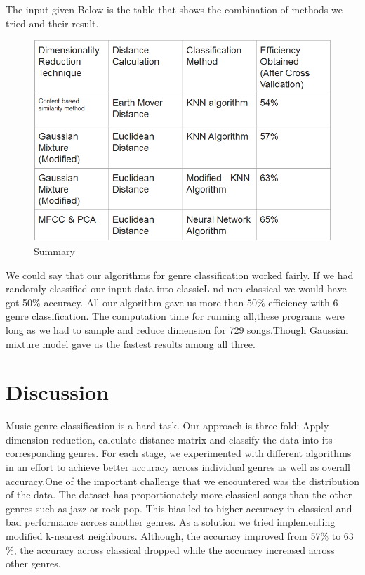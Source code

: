 \documentclass[12pt]{article}
\begin{document}
The input given Below is the table that shows the combination of methods we tried and their result.
\begin{figure}[H]
\center
\includegraphics [scale=0.7]{table.png}
\caption{Summary}
\end{figure}
We could say that our algorithms for genre classification worked fairly. If we had randomly classified our input data into classicL nd non-classical we would have got 50$\%$ accuracy. All our algorithm gave us more than $50\%$ efficiency with 6 genre classification.
The computation time for running all,these programs were long as we had to sample and reduce dimension for 729 songs.Though Gaussian mixture model gave us the fastest results among all three.
\section{Discussion}\label{sec:disc}
Music genre classification is a hard task. Our approach is three fold: Apply dimension reduction, calculate distance matrix and classify the data into its corresponding genres. For each stage, we experimented with different algorithms in an effort to achieve better accuracy across individual genres as well as overall accuracy.One of the important challenge that we encountered was the distribution of the data. The dataset has proportionately more classical songs than the other genres such as jazz or rock pop. This bias led to higher accuracy in classical and bad performance across another genres. As a solution we tried implementing modified k-nearest neighbours. Although, the accuracy improved from 57$\%$ to 63$\%$, the accuracy across classical dropped while the accuracy increased across other genres.
\end{document}
